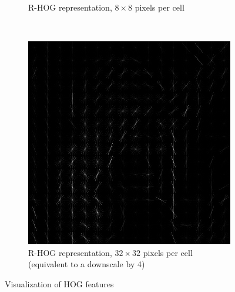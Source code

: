 \begin{figure}[h]
\begin{subfigure}[t]{0.3\textwidth}
        \caption{\acs{R-HOG} representation, $8\times8$ pixels per cell}
    \end{subfigure}
    ~
    \begin{subfigure}[t]{0.3\textwidth}
        \includegraphics[width=\textwidth]{images/lena_hog_32x32}
        \caption{\acs{R-HOG} representation, $32\times32$ pixels per cell (equivalent to a downscale by 4)}
    \end{subfigure}
    \caption{Visualization of \ac{HOG} features}
\end{figure}